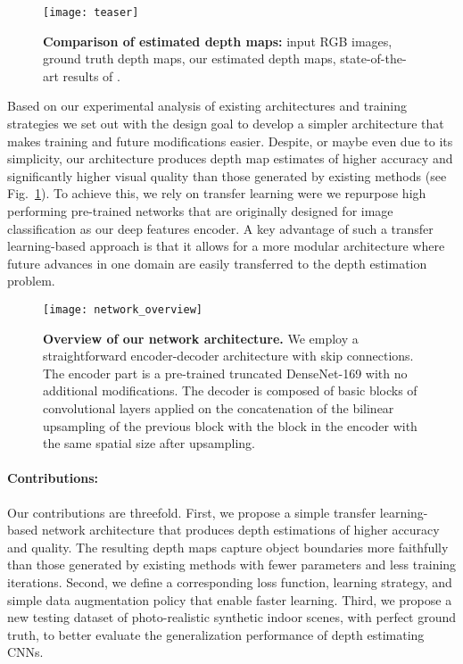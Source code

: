 \documentclass[10pt,twocolumn,letterpaper]{article}
\begin{document}
\begin{figure}[t]
\begin{center}
\texttt{[image: teaser]}
\end{center}
   \caption{\textbf{Comparison of estimated depth maps:} input RGB images, ground truth depth maps, our estimated depth maps, state-of-the-art results of \cite{Fu2018DeepOR}.}
\label{fig:teaser}
\end{figure}



Based on our experimental analysis of existing architectures and training strategies \cite{Eigen2014,Li2015,Laina2016,Xu2017,Fu2018DeepOR} we set out with the design goal to develop a simpler architecture that makes training and future modifications easier. Despite, or maybe even due to its simplicity, our architecture produces depth map estimates of higher accuracy and significantly higher visual quality than those generated by existing methods (see Fig.~\ref{fig:teaser}). To achieve this, we rely on transfer learning were we repurpose high performing pre-trained networks that are originally designed for image classification as our deep features encoder. A key advantage of such a transfer learning-based approach is that it allows for a more modular architecture where future advances in one domain are easily transferred to the depth estimation problem. 


\begin{figure*}
\begin{center}
\texttt{[image: network\_overview]}
\end{center}
   \caption{\textbf{Overview of our network architecture.} We employ a straightforward encoder-decoder architecture with skip connections. The encoder part is a pre-trained truncated DenseNet-169 \cite{huang2017densely} with no additional modifications. The decoder is composed of basic blocks of convolutional layers applied on the concatenation of the  bilinear upsampling of the previous block with the block in the encoder with the same spatial size after upsampling. }
\label{fig:network_overview}
\end{figure*}



\paragraph{Contributions:} Our contributions are threefold. First, we propose a simple transfer learning-based network architecture that produces depth estimations of higher accuracy and quality. The resulting depth maps capture object boundaries more faithfully than those generated by existing methods with fewer parameters and less training iterations. Second, we define a corresponding loss function, learning strategy, and simple data augmentation policy that enable faster learning. Third, we propose a new testing dataset of photo-realistic synthetic indoor scenes, with perfect ground truth, to better evaluate the generalization performance of depth estimating CNNs.
\end{document}
